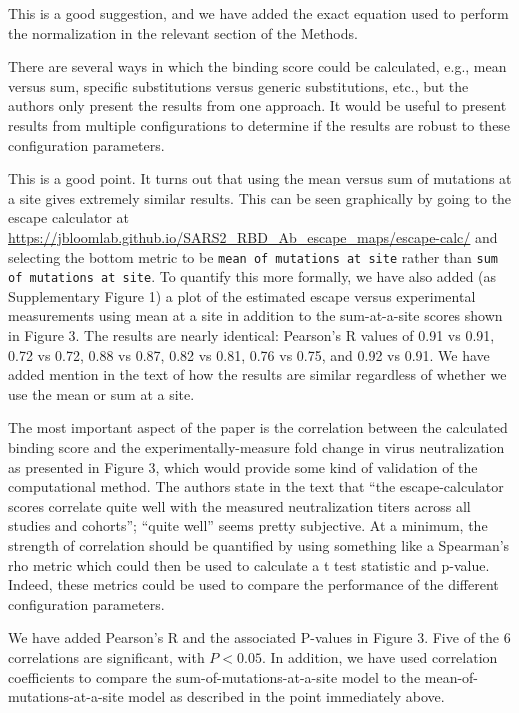 \documentclass[11pt, oneside]{article}   	%
\newcommand{\response}[1]{{\color{black}#1}}
\begin{document}
\response{This is a good suggestion, and we have added the exact equation used to perform the normalization in the relevant section of the Methods.}

There are several ways in which the binding score could be calculated, e.g., mean versus sum, specific substitutions versus generic substitutions, etc., but the authors only present the results from one approach.  It would be useful to present results from multiple configurations to determine if the results are robust to these configuration parameters.

\response{
This is a good point.
It turns out that using the mean versus sum of mutations at a site gives extremely similar results.
This can be seen graphically by going to the escape calculator at \url{https://jbloomlab.github.io/SARS2_RBD_Ab_escape_maps/escape-calc/} and selecting the bottom metric to be \texttt{mean of mutations at site} rather than \texttt{sum of mutations at site}.
To quantify this more formally, we have also added (as Supplementary Figure 1) a plot of the estimated escape versus experimental measurements using mean at a site in addition to the sum-at-a-site scores shown in Figure 3.
The results are nearly identical: Pearson's R values of 0.91 vs 0.91, 0.72 vs 0.72, 0.88 vs 0.87, 0.82 vs 0.81, 0.76 vs 0.75, and 0.92 vs 0.91.
We have added mention in the text of how the results are similar regardless of whether we use the mean or sum at a site.
}

The most important aspect of the paper is the correlation between the calculated binding score and the experimentally-measure fold change in virus neutralization as presented in Figure 3, which would provide some kind of validation of the computational method.  The authors state in the text that “the escape-calculator scores correlate quite well with the measured neutralization titers across all studies and cohorts”; “quite well” seems pretty subjective.  At a minimum, the strength of correlation should be quantified by using something like a Spearman’s rho metric which could then be used to calculate a t test statistic and p-value.  Indeed, these metrics could be used to compare the performance of the different configuration parameters.

\response{
We have added Pearson's R and the associated P-values in Figure 3.
Five of the 6 correlations are significant, with $P < 0.05$.
In addition, we have used correlation coefficients to compare the sum-of-mutations-at-a-site model to the mean-of-mutations-at-a-site model as described in the point immediately above.
}
\end{document}
